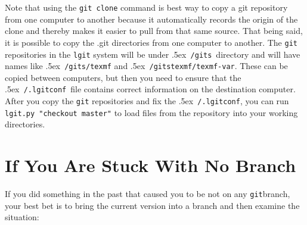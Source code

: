 \documentclass{ltxdoc}
\def\bobtilde{\lower.5ex\hbox{\tt \string~}}%
\def\ucmd#1{{\tt {#1}}}
\def\lgitconf{\bobtilde\ucmd{/.lgitconf}}
\def\mygits{\bobtilde\ucmd{/gits}}
\begin{document}
Note that using the \ucmd{git clone} command is best way to copy a git repository from one computer to another because it automatically records the origin of the clone and thereby makes it easier to pull from that same source. That being said, it is possible to copy the .git directories from one computer to another.  The \ucmd{git} repositories in the \ucmd{lgit} system will be under \mygits\ directory and will have names like \mygits\ucmd{/texmf} and \mygits\ucmd{texmf/texmf-var}.  These can be copied between computers, but then you need to ensure that the \lgitconf\ file contains correct information on the destination computer.  After you copy the \ucmd{git} repositories and fix the \lgitconf, you can run \ucmd{lgit.py "checkout   master"} to load files from the repository into your working directories.

\section{If You Are Stuck With No Branch}
\label{nobranch}If you did something in the past that caused you to be not on any \ucmd{git}branch, your best bet is to bring the current version into a branch and then examine the situation:
\end{document}

